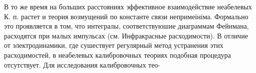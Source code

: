 \documentclass[10pt]{article}
\begin{document}
В то же время на больших расстояниях эффективное взаимодействие неабелевых К. п. растет и теория возмущений по константе связи непримеініма. Формально это проявляется в том, что интегралы, соответствуюшие диаграммам Фейнмана, расходятся при малых импульсах (см. Инфракрасные расходимости). В отличие от электродинамики, где сушествует регулярный метод устранения этих расходимостей, в неабелевых калибровочных теориях подобная процедура отсутствует. Для исследования калибровочных тео-
\end{document}
